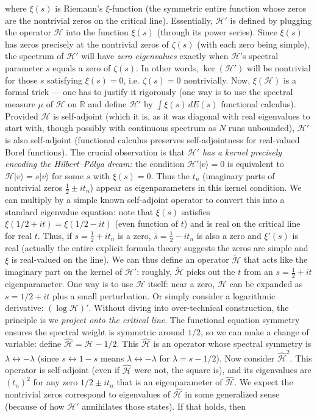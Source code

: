 \documentclass{article}
\begin{document}
\begin{itemize}[leftmargin=*, label={--}]
where $\xi(s)$ is Riemann’s $\xi$-function (the symmetric entire function whose zeros are the nontrivial zeros on the critical line). Essentially, $\mathcal{H}'$ is defined by plugging the operator $\mathcal{H}$ into the function $\xi(s)$ (through its power series). Since $\xi(s)$ has zeros precisely at the nontrivial zeros of $\zeta(s)$ (with each zero being simple), the spectrum of $\mathcal{H}'$ will have \emph{zero eigenvalues} exactly when $\mathcal{H}$’s spectral parameter $s$ equals a zero of $\zeta(s)$. In other words, $\ker(\mathcal{H}')$ will be nontrivial for those $s$ satisfying $\xi(s)=0$, i.e. $\zeta(s)=0$ nontrivially. Now, $\xi(\mathcal{H})$ is a formal trick --- one has to justify it rigorously (one way is to use the spectral measure $\mu$ of $\mathcal{H}$ on $\mathbb{R}$ and define $\mathcal{H}'$ by $\int \xi(s)\,dE(s)$ functional calculus). Provided $\mathcal{H}$ is self-adjoint (which it is, as it was diagonal with real eigenvalues to start with, though possibly with continuous spectrum as $N$ runs unbounded), $\mathcal{H}'$ is also self-adjoint (functional calculus preserves self-adjointness for real-valued Borel functions). The crucial observation is that \emph{$\mathcal{H}'$ has a kernel precisely encoding the Hilbert--P\'olya dream:} the condition $\mathcal{H}' |v\rangle = 0$ is equivalent to $\mathcal{H}|v\rangle = s |v\rangle$ for some $s$ with $\xi(s)=0$. Thus the $t_n$ (imaginary parts of nontrivial zeros $\frac12 \pm i t_n$) appear as eigenparameters in this kernel condition. We can multiply by a simple known self-adjoint operator to convert this into a standard eigenvalue equation: note that $\xi(s)$ satisfies $\xi(1/2+it) = \xi(1/2-it)$ (even function of $t$) and is real on the critical line for real $t$. Thus, if $s=\frac12 + it_n$ is a zero, $\overline{s}=\frac12 - it_n$ is also a zero and $\xi'(s)$ is real (actually the entire explicit formula theory suggests the zeros are simple and $\xi$ is real-valued on the line). We can thus define an operator $\tilde{\mathcal{H}}$ that acts like the imaginary part on the kernel of $\mathcal{H}'$: roughly, $\tilde{\mathcal{H}}$ picks out the $t$ from an $s=\frac12+it$ eigenparameter. One way is to use $\mathcal{H}$ itself: near a zero, $\mathcal{H}$ can be expanded as $s = 1/2 + it$ plus a small perturbation. Or simply consider a logarithmic derivative: $(\log \mathcal{H})'$. Without diving into over-technical construction, the principle is we \emph{project onto the critical line}. The functional equation symmetry ensures the spectral weight is symmetric around $1/2$, so we can make a change of variable: define $\hat{\mathcal{H}} = \mathcal{H} - 1/2$. This $\hat{\mathcal{H}}$ is an operator whose spectral symmetry is $\lambda \leftrightarrow -\lambda$ (since $s \leftrightarrow 1-s$ means $\lambda \leftrightarrow -\lambda$ for $\lambda = s-1/2$). Now consider $\hat{\mathcal{H}}^2$. This operator is self-adjoint (even if $\hat{\mathcal{H}}$ were not, the square is), and its eigenvalues are $(t_n)^2$ for any zero $1/2 \pm it_n$ that is an eigenparameter of $\hat{\mathcal{H}}$. We expect the nontrivial zeros correspond to eigenvalues of $\hat{\mathcal{H}}$ in some generalized sense (because of how $\mathcal{H}'$ annihilates those states). If that holds, then 
\end{itemize}
\end{document}
